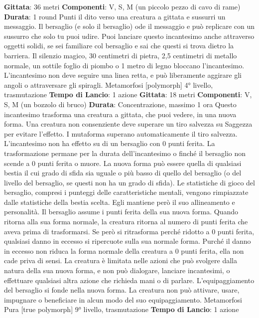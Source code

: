 \begin{multicols}{2}
\textbf{Gittata}: 36 metri
\textbf{Componenti}: V, S, M (un piccolo pezzo di cavo di
rame)
\textbf{Durata}: 1 round
Punti il dito verso una creatura a gittata e sussurri un
messaggio. Il bersaglio (e solo il bersaglio) ode il
messaggio e può replicare con un sussurro che solo tu
puoi udire.
Puoi lanciare questo incantesimo anche attraverso
oggetti solidi, se sei familiare col bersaglio e sai che
questi si trova dietro la barriera. Il silenzio magico, 30
centimetri di pietra, 2,5 centimetri di metallo normale,
un sottile foglio di piombo o 1 metro di legno bloccano
l’incantesimo. L’incantesimo non deve seguire una linea
retta, e può liberamente aggirare gli angoli o
attraversare gli spiragli.
Metamorfosi
[polymorph]
4° livello, trasmutazione
\textbf{Tempo di Lancio}: 1 azione
\textbf{Gittata}: 18 metri
\textbf{Componenti}: V, S, M (un bozzolo di bruco)
\textbf{Durata}: Concentrazione, massimo 1 ora
Questo incantesimo trasforma una creatura a gittata,
che puoi vedere, in una nuova forma. Una creatura non
consenziente deve superare un tiro salvezza su
Saggezza per evitare l’effetto. I mutaforma superano
automaticamente il tiro salvezza. L’incantesimo non ha
effetto su di un bersaglio con 0 punti ferita.
La trasformazione permane per la durata
dell’incantesimo o finché il bersaglio non scende a 0
punti ferita o muore. La nuova forma può essere quella
di qualsiasi bestia il cui grado di sfida sia uguale o più
basso di quello del bersaglio (o del livello del bersaglio,
se questi non ha un grado di sfida). Le statistiche di
gioco del bersaglio, compresi i punteggi delle
caratteristiche mentali, vengono rimpiazzate dalle 
statistiche della bestia scelta. Egli mantiene però il suo
allineamento e personalità.
Il bersaglio assume i punti ferita della sua nuova forma.
Quando ritorna alla sua forma normale, la creatura
ritorna al numero di punti ferita che aveva prima di
trasformarsi. Se però si ritrasforma perché ridotto a 0
punti ferita, qualsiasi danno in eccesso si ripercuote
sulla sua normale forma. Purché il danno in eccesso
non riduca la forma normale della creatura a 0 punti
ferita, ella non cade priva di sensi.
La creatura è limitata nelle azioni che può svolgere
dalla natura della sua nuova forma, e non può
dialogare, lanciare incantesimi, o effettuare qualsiasi
altra azione che richieda mani o di parlare.
L’equipaggiamento del bersaglio si fonde nella nuova
forma. La creatura non può attivare, usare, impugnare o
beneficiare in alcun modo del suo equipaggiamento.
Metamorfosi Pura
[true polymorph]
9° livello, trasmutazione
\textbf{Tempo di Lancio}: 1 azione

\end{multicols}
